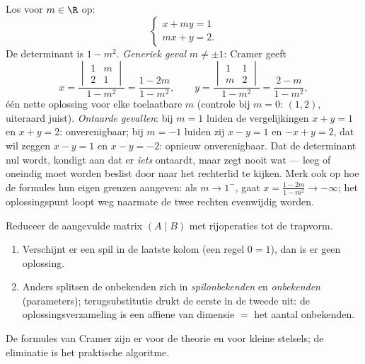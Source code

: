 \begin{example}
\label{ex:b1:det:cramerparameter}
Los voor $m \in \R$ op:
\[
\begin{cases}
x + m y = 1\\
m x + y = 2 .
\end{cases}
\]
De determinant is $1 - m^2$. \emph{Generiek geval} $m \neq \pm1$:
Cramer geeft
\[
x = \frac{\begin{vmatrix} 1 & m\\ 2 & 1\end{vmatrix}}{1 - m^2}
= \frac{1 - 2m}{1 - m^2},
\qquad
y = \frac{\begin{vmatrix} 1 & 1\\ m & 2\end{vmatrix}}{1 - m^2}
= \frac{2 - m}{1 - m^2},
\]
één nette oplossing voor elke toelaatbare $m$ (controle bij $m =
0$: $(1, 2)$, uiteraard juist). \emph{Ontaarde gevallen}: bij $m =
1$ luiden de vergelijkingen $x + y = 1$ en $x + y = 2$:
onverenigbaar; bij $m = -1$ luiden zij $x - y = 1$ en $-x + y = 2$,
dat wil zeggen $x - y = 1$ en $x - y = -2$: opnieuw onverenigbaar.
Dat de determinant nul wordt, kondigt aan dat er \emph{iets}
ontaardt, maar zegt nooit wat --- leeg of oneindig moet worden
beslist door naar het rechterlid te kijken. Merk ook op hoe de
formules hun eigen grenzen aangeven: als $m \to 1^{-}$, gaat $x =
\frac{1 - 2m}{1 - m^2} \to -\infty$; het oplossingspunt loopt weg
naarmate de twee rechten evenwijdig worden.
\end{example}

\begin{method}\label{met:b1:det:gauss}
Reduceer de aangevulde matrix $(A \mid B)$ met rijoperaties tot de
trapvorm.
\begin{enumerate}
  \item Verschijnt er een spil in de laatste kolom (een regel $0 =
        1$), dan is er geen oplossing.
  \item Anders splitsen de onbekenden zich in \emph{spilonbekenden}
        en \emph{ onbekenden} (parameters); terugsubstitutie
        drukt de eerste in de tweede uit: de
        oplossingsverzameling is een affiene  van dimensie
        $=$ het aantal  onbekenden.
\end{enumerate}
De formules van Cramer zijn er voor de theorie en voor kleine
stelsels; de eliminatie is het praktische algoritme.
\end{method}

